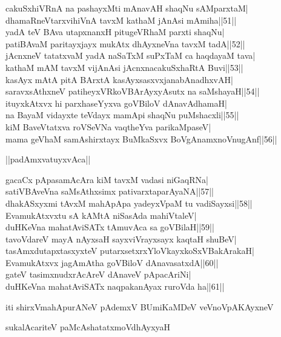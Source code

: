 \documentclass{article}
\begin{document}
cakuSxhiVRnA na pashayxMti mAnavAH shaqNu sAMparxtaM|\\
dhamaRneVtarxvihiVnA tavxM kathaM jAnAsi mAmiha||51||\\
yadA teV BAva utapxnanxH pitugeVRhaM parxti shaqNu|\\
patiBAvaM paritayxjayx mukAtx dhAyxneVna tavxM tadA||52||\\
jAcnxneV tatatxvaM yadA naSaTxM suPxTaM ca haqdayaM tava|\\
kathaM mAM tavxM vijAnAsi jAcnxnacakuSxhaRtA Buvi||53||\\
kasAyx mAtA pitA BArxtA kasAyxsasxvxjanabAnadhxvAH|\\
saravxsAthxneV patiheyxVRkoVBArAyxyAsutx na saMshayaH||54||\\
ituyxkAtxvx hi parxhaseYyxva goVBiloV dAnavAdhamaH|\\
na BayaM vidayxte teVdayx mamApi shaqNu puMshacxli||55||\\
kiM BaveVtatxva roVSeVNa vaqtheYva parikaMpaseV|\\
mama geVhaM samAshirxtayx BuMkaSxvx BoVgAnamxnoVnugAnf||56||\\

\begin{center}
||padAmxvatuyxvAca||
\end{center}

gacaCx pApasamAcAra kiM tavxM vadasi niGaqRNa|\\
satiVBAveVna saMsAthxsimx pativarxtaparAyaNA||57||\\
dhakASxyxmi tAvxM mahApApa yadeyxVpaM tu vadiSayxsi||58||\\
EvamukAtxvxtu sA kAMtA niSasAda mahiVtaleV|\\
duHKeVna mahatAviSATx tAmuvAca sa goVBilaH||59||\\
tavoVdareV mayA nAyxsaH sayxviVrayxsayx kaqtaH shuBeV|\\
tasAmxdutapxtasxyxteV putarxsetxrxYloVkayxkoSxVBakArakaH|\\
EvamukAtxvx jagAmAtha goVBiloV dAnavasatxdA||60||\\
gateV tasimxnudxrAcAreV dAnaveV pApacAriNi|\\
duHKeVna mahatAviSATx naqpakanAyax ruroVda ha||61||

\begin{center}
iti shirxVmahApurANeV pAdemxV BUmiKaMDeV veVnoVpAKAyxneV
\end{center}

\begin{center}
sukalAcariteV paMcAshatatxmoVdhAyxyaH
\end{center}
\end{document}
